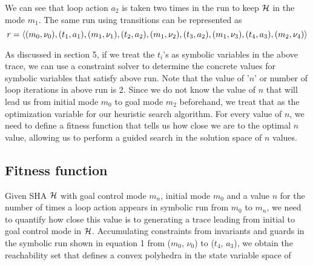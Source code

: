 We can see that loop action $a_{2}$ is taken two times in the run to keep $\mathcal{H}$ in the mode $m_{1}$. The same run using transitions can be represented as   
\begin{equation}
  r = \langle (m_0, \nu_0), (t_1, a_1), (m_1, \nu_1), (t_2, a_2), (m_1, \nu_2), (t_3, a_2), (m_1, \nu_3), (t_4, a_3), (m_2, \nu_4) \rangle
\end{equation}

As discussed in section 5, if we treat the $t_i$'s as symbolic variables in the above trace, we can use a constraint solver to determine the concrete values for symbolic variables that satisfy above run. Note that the value of '$\textit{n}$' or number of loop iterations in above run is 2. Since we do not know the value of $\textit{n}$ that will lead us from initial mode $m_{0}$ to goal mode $m_{2}$ beforehand, we treat that as the optimization variable for our heuristic search algorithm. For every value of $\textit{n}$, we need to define a fitness function that tells us how close we are to the optimal $\textit{n}$ value, allowing us to perform a guided search in the solution space of $\textit{n}$ values. 

\subsection{Fitness function}
Given SHA $\mathcal{H}$ with goal control mode $m_{n}$, initial mode $m_{0}$ and a value $\textit{n}$ for the number of times a loop action appears in symbolic run from $m_{0}$ to $m_{n}$, we need to quantify how close this value is to generating a trace leading from initial to goal control mode in $\mathcal{H}$. Accumulating constraints from invariants and guards in the symbolic run shown in equation 1 from ($m_{0}$, $\nu_{0}$) to ($t_{4}$, $a_{3}$), we obtain the reachability set that defines a convex polyhedra in the state variable space of 
